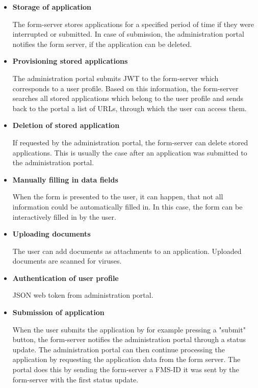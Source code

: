 \documentclass[
     12pt,         %
     a4paper,      %
     BCOR=10mm,version=first,     %
     DIV=14,version=first,        %
     ]{scrreprt}
\begin{document}
\begin{itemize}
    \item \textbf{Storage of application}
    
    The form-server stores applications for a specified period of time if they were interrupted or submitted. In case of submission, the administration portal notifies the form server, if the application can be deleted.
    
    \item \textbf{Provisioning stored applications}
    
    The administration portal submits JWT to the form-server which corresponds to a user profile. Based on this information, the form-server searches all stored applications which belong to the user profile and sends back to the portal a list of URLs, through which the user can access them.
    
    \item \textbf{Deletion of stored application}

    If requested by the administration portal, the form-server can delete stored applications. This is usually the case after an application was submitted to the administration portal.

    \item \textbf{Manually filling in data fields}
    
    When the form is presented to the user, it can happen, that not all information could be automatically filled in. In this case, the form can be interactively filled in by the user.
    
    \item \textbf{Uploading documents}
    
    The user can add documents as attachments to an application. Uploaded documents are scanned for viruses.
    
    \item \textbf{Authentication of user profile}
    
    JSON web token from administration portal.

    \item \textbf{Submission of application}
    
    When the user submits the application by for example pressing a "submit" button, the form-server notifies the administration portal through a status update. The administration portal can then continue processing the application by requesting the application data from the form server. The portal does this by sending the form-server a FMS-ID it was sent by the form-server with the first status update. 
    
\end{itemize}
\end{document}
